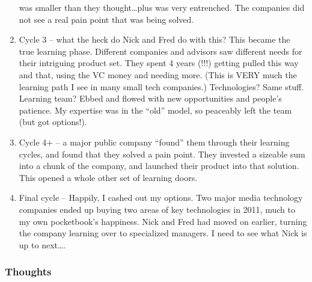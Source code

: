 \begin{enumerate}
  was smaller than they thought\ldots{}plus was very entrenched. The
  companies did not see a real pain point that was being solved.
\item
  Cycle 3 -- what the heck do Nick and Fred do with this? This became
  the true learning phase. Different companies and advisors saw
  different needs for their intriguing product set. They spent 4 years
  (!!!) getting pulled this way and that, using the VC money and needing
  more. (This is VERY much the learning path I see in many small tech
  companies.) Technologies? Same stuff. Learning team? Ebbed and flowed
  with new opportunities and people's patience. My expertise was in the
  ``old'' model, so peaceably left the team (but got options!).
\item
  Cycle 4+ -- a major public company ``found'' them through their
  learning cycles, and found that they solved a pain point. They
  invested a sizeable sum into a chunk of the company, and launched
  their product into that solution. This opened a whole other set of
  learning doors.
\item
  Final cycle -- Happily, I cashed out my options. Two major media
  technology companies ended up buying two areas of key technologies in
  2011, much to my own pocketbook's happiness. Nick and Fred had moved
  on earlier, turning the company learning over to specialized managers.
  I need to see what Nick is up to next\ldots{}.
\end{enumerate}
\subsubsection{Thoughts}

